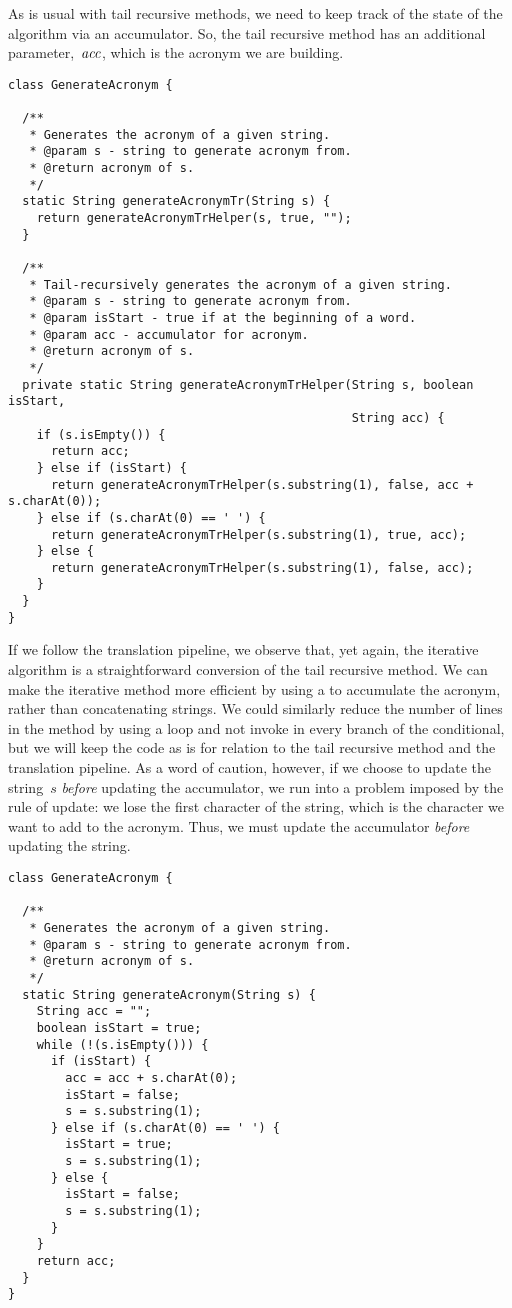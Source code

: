 As is usual with tail recursive methods, we need to keep track of the state of the algorithm via an accumulator.
So, the tail recursive method has an additional parameter,~$\emph{acc}$, which is the acronym we are building.

\begin{lstlisting}[language=MyJava]
class GenerateAcronym {

  /**
   * Generates the acronym of a given string.
   * @param s - string to generate acronym from.
   * @return acronym of s.
   */
  static String generateAcronymTr(String s) {
    return generateAcronymTrHelper(s, true, "");
  }

  /**
   * Tail-recursively generates the acronym of a given string.
   * @param s - string to generate acronym from.
   * @param isStart - true if at the beginning of a word.
   * @param acc - accumulator for acronym.
   * @return acronym of s.
   */
  private static String generateAcronymTrHelper(String s, boolean isStart, 
                                                String acc) {
    if (s.isEmpty()) { 
      return acc; 
    } else if (isStart) { 
      return generateAcronymTrHelper(s.substring(1), false, acc + s.charAt(0)); 
    } else if (s.charAt(0) == ' ') { 
      return generateAcronymTrHelper(s.substring(1), true, acc); 
    } else { 
      return generateAcronymTrHelper(s.substring(1), false, acc); 
    }
  }
}
\end{lstlisting}

If we follow the translation pipeline, we observe that, yet again, the iterative algorithm is a straightforward conversion of the tail recursive method. 
We can make the iterative method more efficient by using a  to accumulate the acronym, rather than concatenating strings.
We could similarly reduce the number of lines in the method by using a  loop and not invoke  in every branch of the conditional, but we will keep the code as is for relation to the tail recursive method and the translation pipeline.
As a word of caution, however, if we choose to update the string~$s$ \emph{before} updating the accumulator, we run into a problem imposed by the rule of update: we lose the first character of the string, which is the character we want to add to the acronym. 
Thus, we must update the accumulator \emph{before} updating the string.

\begin{lstlisting}[language=MyJava]
class GenerateAcronym {

  /**
   * Generates the acronym of a given string.
   * @param s - string to generate acronym from.
   * @return acronym of s.
   */
  static String generateAcronym(String s) {
    String acc = "";
    boolean isStart = true;
    while (!(s.isEmpty())) {
      if (isStart) { 
        acc = acc + s.charAt(0);
        isStart = false; 
        s = s.substring(1);
      } else if (s.charAt(0) == ' ') { 
        isStart = true; 
        s = s.substring(1);
      } else {
        isStart = false;
        s = s.substring(1);
      }
    }
    return acc;
  }
}
\end{lstlisting}

